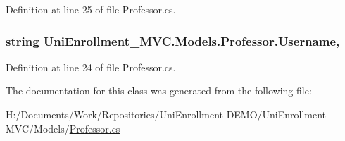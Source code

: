 Definition at line 25 of file Professor.\+cs.

\subsubsection[{\texorpdfstring{Username}{Username}}]{\setlength{\rightskip}{0pt plus 5cm}string Uni\+Enrollment\+\_\+\+M\+V\+C.\+Models.\+Professor.\+Username\hspace{0.3cm}{\ttfamily [get]}, {\ttfamily [set]}}\hypertarget{class_uni_enrollment___m_v_c_1_1_models_1_1_professor_aad5384f0fb0a4647d5ccfdbb1a3ecc12}{}\label{class_uni_enrollment___m_v_c_1_1_models_1_1_professor_aad5384f0fb0a4647d5ccfdbb1a3ecc12}


Definition at line 24 of file Professor.\+cs.



The documentation for this class was generated from the following file\+:\begin{DoxyCompactItemize}
\item 
H\+:/\+Documents/\+Work/\+Repositories/\+Uni\+Enrollment-\/\+D\+E\+M\+O/\+Uni\+Enrollment-\/\+M\+V\+C/\+Models/\hyperlink{_professor_8cs}{Professor.\+cs}\end{DoxyCompactItemize}
